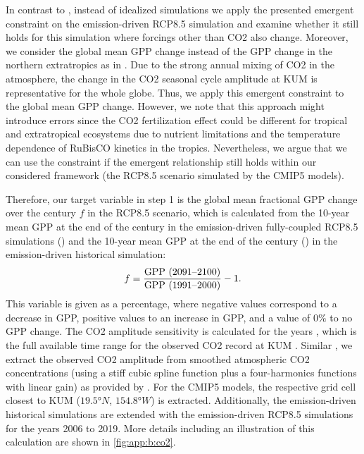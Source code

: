 In contrast to \textcite{Wenzel2016}, instead of idealized simulations we apply
the presented emergent constraint on the emission-driven \acs{RCP}8.5
simulation \autocite{Riahi2011} and examine whether it still holds for this
simulation where forcings other than \ac{CO2} also change. Moreover, we
consider the global mean \ac{GPP} change instead of the \ac{GPP} change in the
northern extratropics as in \textcite{Wenzel2016}. Due to the strong annual
mixing of \ac{CO2} in the atmosphere, the change in the \ac{CO2} seasonal cycle
amplitude at \ac{KUM} is representative for the whole globe. Thus, we apply
this emergent constraint to the global mean \ac{GPP} change. However, we note
that this approach might introduce errors since the \ac{CO2} fertilization
effect could be different for tropical and extratropical ecosystems due to
nutrient limitations and the temperature dependence of \ac{RuBisCO} kinetics
\autocite{CraftsBrandner2000} in the tropics. Nevertheless, we argue that we
can use the constraint if the emergent relationship still holds within our
considered framework (the \acs{RCP}8.5 scenario simulated by the \acs{CMIP}5
models).

Therefore, our target variable in step 1 is the global mean fractional
\acs{GPP} change over the  century $f$ in the \acs{RCP}8.5 scenario,
which is calculated from the 10-year mean \ac{GPP} at the end of the 
century in the emission-driven fully-coupled \acs{RCP}8.5 simulations
() and the 10-year mean \ac{GPP} at the end of the 
century () in the emission-driven historical simulation:
\begin{equation}
  f = \frac{\textnormal{GPP (2091\textnormal{--}2100)}}{
    \textnormal{GPP (1991\textnormal{--}2000)}} - 1.
  \label{eq:06:f}
\end{equation}
This variable is given as a percentage, where negative values correspond to a
decrease in \ac{GPP}, positive values to an increase in \ac{GPP}, and a value
of $0 \unit{\%}$ to no \ac{GPP} change. The \ac{CO2} amplitude sensitivity is
calculated for the years , which is the full available time
range for the observed \ac{CO2} record at \ac{KUM} \autocite{Keeling2005}.
Similar \textcite{Wenzel2016}, we extract the observed \ac{CO2} amplitude from
smoothed atmospheric \ac{CO2} concentrations (using a stiff cubic spline
function plus a four-harmonics functions with linear gain) as provided by
\textcite{Keeling2005}. For the \acs{CMIP}5 models, the respective grid cell
closest to \ac{KUM} ($19.5 \unit{\degree N}$, $154.8 \unit{\degree W}$) is
extracted. Additionally, the emission-driven historical simulations are
extended with the emission-driven \acs{RCP}8.5 simulations for the years 2006
to 2019. More details including an illustration of this calculation are shown
in \cref{fig:app:b:co2}.

